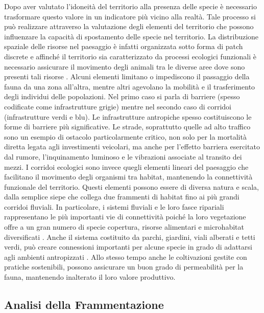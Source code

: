 \documentclass[
  a4paper,
]{book}
\begin{document}
Dopo aver valutato l'idoneità del territorio alla presenza delle specie è necessario trasformare questo valore in un indicatore più vicino alla realtà.
Tale processo si può realizzare attraverso la valutazione degli elementi del territorio che possono influenzare la capacità di spostamento delle specie nel territorio.
La distribuzione spaziale delle risorse nel paesaggio è infatti organizzata sotto forma di patch discrete e affinché il territorio sia caratterizzato da processi ecologici funzionali è necessario assicurare il movimento degli animali tra le diverse aree dove sono presenti tali risorse \citep{taylorConnectivityVitalElement1993}.
Alcuni elementi limitano o impediscono il passaggio della fauna da una zona all'altra, mentre altri agevolano la mobilità e il trasferimento degli individui delle popolazioni.
Nel primo caso si parla di barriere (spesso codificate come infrastrutture grigie) mentre nel secondo caso di corridoi (infrastrutture verdi e blu).
Le infrastrutture antropiche spesso costituiscono le forme di barriere più significative.
Le strade, soprattutto quelle ad alto traffico sono un esempio di ostacolo particolarmente critico, non solo per la mortalità diretta legata agli investimenti veicolari, ma anche per l'effetto barriera esercitato dal rumore, l'inquinamento luminoso e le vibrazioni associate al transito dei mezzi.
I corridoi ecologici sono invece quegli elementi lineari del paesaggio che facilitano il movimento degli organismi tra habitat, mantenendo la connettività funzionale del territorio.
Questi elementi possono essere di diversa natura e scala, dalla semplice siepe che collega due frammenti di habitat fino ai più grandi corridoi fluviali.
In particolare, i sistemi fluviali e le loro fasce ripariali rappresentano le più importanti vie di connettività poiché la loro vegetazione offre a un gran numero di specie copertura, risorse alimentari e microhabitat diversificati \citep{taylorConnectivityVitalElement1993}.
Anche il sistema costituito da parchi, giardini, viali alberati e tetti verdi, può creare connessioni importanti per alcune specie in grado di adattarsi agli ambienti antropizzati \citep{simaika2016, proske2022, nie2021, gann2019}.
Allo stesso tempo anche le coltivazioni gestite con pratiche sostenibili, possono assicurare un buon grado di permeabilità per la fauna, mantenendo inalterato il loro valore produttivo.

\subsection{Analisi della Frammentazione}\label{analisi-della-frammentazione}
\end{document}
